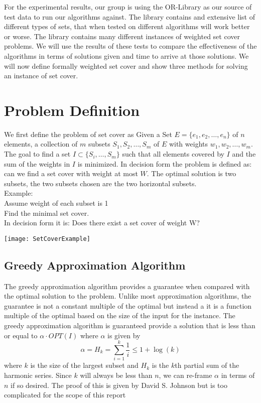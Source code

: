 \documentclass{report}
\begin{document}
For the experimental results, our group is using the OR-Library as our source of test data to run our algorithms against. The library contains and extensive list of different types of sets, that when tested on different algorithms will work better or worse. The library contains many different instances of weighted set cover problems. We will use the results of these tests to compare the effectiveness of the algorithms in terms of solutions given and time to arrive at those solutions. We will now define formally weighted set cover and show three methods for solving an instance of set cover.

\section{Problem Definition}
We first define the problem of set cover as Given a Set $E = \{e_1, e_2, \ldots ,e_n\}$ of $n$ elements, a collection of $m$ subsets $S_1, S_2, \ldots ,S_m$ of $E$ with weights $w_1, w_2, \ldots, w_m$. The goal to find a set $I \subset \{S_i, \ldots, S_m\}$ such that all elements covered by $I$ and the sum of the weights in $I$ is minimized. In decision form the problem is defined as: can we find a set cover with weight at most $W$. The optimal solution is two subsets, the two subsets chosen are the two horizontal subsets.\\
Example:\\
Assume weight of each subset is 1\\
Find the minimal set cover.\\
In decision form it is: Does there exist a set cover of weight W?

\texttt{[image: SetCoverExample]}

\subsection{Greedy Approximation Algorithm}
The greedy approximation algorithm provides a guarantee when compared with the optimal solution to the problem. Unlike most approximation algorithms, the guarantee is not a constant multiple of the optimal but instead a it is a function multiple of the optimal based on the size of the input for the instance. The greedy approximation algorithm is guaranteed provide a solution that is less than or equal to $\alpha \cdot OPT(I)$ where $\alpha$ is given by $$\alpha = H_k = \sum_{i=1}^k \frac{1}{i}\leq 1+\log(k)$$ where $k$ is the size of the largest subset and $H_k$ is the $k$th partial sum of the harmonic series. Since $k$ will always be less than $n$, we can re-frame $\alpha$ in terms of $n$ if so desired. The proof of this is given by David S. Johnson but is too complicated for the scope of this report %
\end{document}
